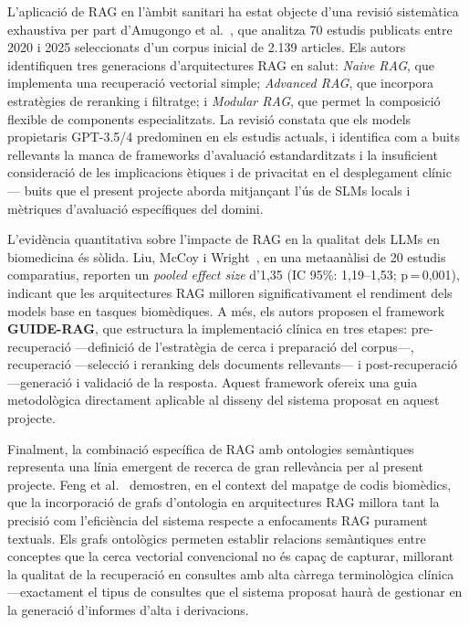 \documentclass[11pt,a4paper]{article}
\begin{document}
L'aplicació de RAG en l'àmbit sanitari ha estat objecte d'una revisió sistemàtica exhaustiva per part d'Amugongo et al.~\cite{amugongo2025rag}, que analitza 70 estudis publicats entre 2020 i 2025 seleccionats d'un corpus inicial de 2.139 articles. Els autors identifiquen tres generacions d'arquitectures RAG en salut: \textit{Naive RAG}, que implementa una recuperació vectorial simple; \textit{Advanced RAG}, que incorpora estratègies de reranking i filtratge; i \textit{Modular RAG}, que permet la composició flexible de components especialitzats. La revisió constata que els models propietaris GPT-3.5/4 predominen en els estudis actuals, i identifica com a buits rellevants la manca de frameworks d'avaluació estandarditzats i la insuficient consideració de les implicacions ètiques i de privacitat en el desplegament clínic --- buits que el present projecte aborda mitjançant l'ús de SLMs locals i mètriques d'avaluació específiques del domini.

L'evidència quantitativa sobre l'impacte de RAG en la qualitat dels LLMs en biomedicina és sòlida. Liu, McCoy i Wright~\cite{liu2025rag}, en una metaanàlisi de 20 estudis comparatius, reporten un \textit{pooled effect size} d'1,35 (IC 95\%: 1,19--1,53; p\,=\,0,001), indicant que les arquitectures RAG milloren significativament el rendiment dels models base en tasques biomèdiques. A més, els autors proposen el framework \textbf{GUIDE-RAG}, que estructura la implementació clínica en tres etapes: pre-recuperació ---definició de l'estratègia de cerca i preparació del corpus---, recuperació ---selecció i reranking dels documents rellevants--- i post-recuperació ---generació i validació de la resposta. Aquest framework ofereix una guia metodològica directament aplicable al disseny del sistema proposat en aquest projecte.

Finalment, la combinació específica de RAG amb ontologies semàntiques representa una línia emergent de recerca de gran rellevància per al present projecte. Feng et al.~\cite{feng2025ontologyrag} demostren, en el context del mapatge de codis biomèdics, que la incorporació de grafs d'ontologia en arquitectures RAG millora tant la precisió com l'eficiència del sistema respecte a enfocaments RAG purament textuals. Els grafs ontològics permeten establir relacions semàntiques entre conceptes que la cerca vectorial convencional no és capaç de capturar, millorant la qualitat de la recuperació en consultes amb alta càrrega terminològica clínica ---exactament el tipus de consultes que el sistema proposat haurà de gestionar en la generació d'informes d'alta i derivacions.
\end{document}
